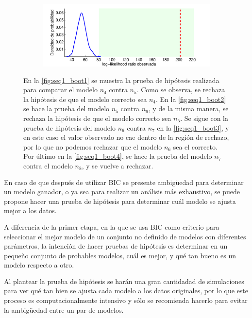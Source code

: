 \begin{figure}[t!]
{\begin{subfigure}[b]{0.7\textwidth}
      \caption{}
      \label{fig:seq1_boot3}
    \end{subfigure}
    \hspace{-0.5cm}
    \begin{subfigure}[b]{0.7\textwidth}
      \includegraphics[width=1\linewidth]{gfx/chap6/cuervoboot4}
      \caption{}
      \label{fig:seq1_boot4}
    \end{subfigure}
  }
  \caption{En la \autoref{fig:seq1_boot1} se muestra la prueba de hipótesis realizada para comparar el modelo $n_4$ contra $n_5$. Como se observa, se rechaza la hipótesis de que el modelo correcto sea $n_4$. En la \autoref{fig:seq1_boot2} se hace la prueba del modelo $n_5$ contra $n_6$, y de la misma manera, se rechaza la hipótesis de que el modelo correcto sea $n_5$. Se sigue con la prueba de hipótesis del modelo $n_6$ contra $n_7$ en la \autoref{fig:seq1_boot3}, y en este caso el valor observado no cae dentro de la región de rechazo, por lo que no podemos rechazar que el modelo $n_6$ sea el correcto. Por último en la \autoref{fig:seq1_boot4}, se hace la prueba del modelo $n_7$ contra el modelo $n_8$, y se vuelve a rechazar.}
  \label{fig:seq1_boot}
\end{figure}

En caso de que después de utilizar BIC se presente ambigüedad para determinar un modelo ganador, o ya sea para realizar un análisis más exhaustivo, se puede propone hacer una prueba de hipótesis para determinar cuál modelo se ajusta mejor a los datos.

A diferencia de la primer etapa, en la que se usa BIC como criterio para  seleccionar el mejor modelo de un conjunto no definido de modelos con diferentes parámetros, la intención de hacer pruebas de hipótesis es determinar en un pequeño conjunto de probables modelos, cuál es mejor, y qué tan bueno es un modelo respecto a otro.

Al plantear la prueba de hipótesis se harán una gran cantidadad de simulaciones para ver qué tan bien se ajusta cada modelo a los datos originales, por lo que este proceso es computacionalmente intensivo y sólo se recomienda hacerlo para evitar la ambigüedad entre un par de modelos.

